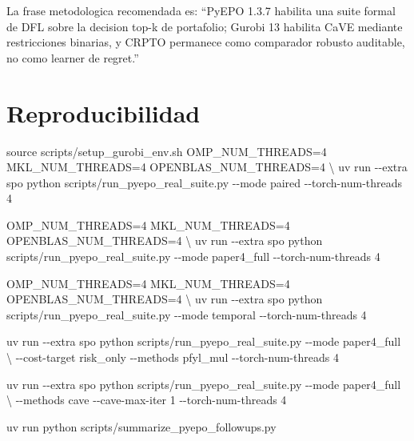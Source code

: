 \documentclass[
  spanish,
  11pt,
  letterpaper,
]{scrbook}
\newenvironment{Shaded}{\begin{snugshade}}{\end{snugshade}}
\newcommand{\AttributeTok}[1]{\textcolor[rgb]{0.40,0.45,0.13}{#1}}
\newcommand{\BuiltInTok}[1]{\textcolor[rgb]{0.00,0.23,0.31}{#1}}
\newcommand{\DataTypeTok}[1]{\textcolor[rgb]{0.68,0.00,0.00}{#1}}
\newcommand{\ExtensionTok}[1]{\textcolor[rgb]{0.00,0.23,0.31}{#1}}
\newcommand{\NormalTok}[1]{\textcolor[rgb]{0.00,0.23,0.31}{#1}}
\newcommand{\OperatorTok}[1]{\textcolor[rgb]{0.37,0.37,0.37}{#1}}
\newcommand{\VariableTok}[1]{\textcolor[rgb]{0.07,0.07,0.07}{#1}}
\theoremstyle{plain}
\theoremstyle{remark}
\begin{document}
La frase metodologica recomendada es: ``PyEPO 1.3.7 habilita una suite
formal de DFL sobre la decision top-k de portafolio; Gurobi 13 habilita
CaVE mediante restricciones binarias, y CRPTO permanece como comparador
robusto auditable, no como learner de regret.''

\section{Reproducibilidad}\label{reproducibilidad}

\begin{Shaded}
\begin{Highlighting}[]
\BuiltInTok{source}\NormalTok{ scripts/setup\_gurobi\_env.sh}
\VariableTok{OMP\_NUM\_THREADS}\OperatorTok{=}\NormalTok{4 }\VariableTok{MKL\_NUM\_THREADS}\OperatorTok{=}\NormalTok{4 }\VariableTok{OPENBLAS\_NUM\_THREADS}\OperatorTok{=}\NormalTok{4 }\DataTypeTok{\textbackslash{}}
\ExtensionTok{uv}\NormalTok{ run }\AttributeTok{{-}{-}extra}\NormalTok{ spo python scripts/run\_pyepo\_real\_suite.py }\AttributeTok{{-}{-}mode}\NormalTok{ paired }\AttributeTok{{-}{-}torch{-}num{-}threads}\NormalTok{ 4}

\VariableTok{OMP\_NUM\_THREADS}\OperatorTok{=}\NormalTok{4 }\VariableTok{MKL\_NUM\_THREADS}\OperatorTok{=}\NormalTok{4 }\VariableTok{OPENBLAS\_NUM\_THREADS}\OperatorTok{=}\NormalTok{4 }\DataTypeTok{\textbackslash{}}
\ExtensionTok{uv}\NormalTok{ run }\AttributeTok{{-}{-}extra}\NormalTok{ spo python scripts/run\_pyepo\_real\_suite.py }\AttributeTok{{-}{-}mode}\NormalTok{ paper4\_full }\AttributeTok{{-}{-}torch{-}num{-}threads}\NormalTok{ 4}

\VariableTok{OMP\_NUM\_THREADS}\OperatorTok{=}\NormalTok{4 }\VariableTok{MKL\_NUM\_THREADS}\OperatorTok{=}\NormalTok{4 }\VariableTok{OPENBLAS\_NUM\_THREADS}\OperatorTok{=}\NormalTok{4 }\DataTypeTok{\textbackslash{}}
\ExtensionTok{uv}\NormalTok{ run }\AttributeTok{{-}{-}extra}\NormalTok{ spo python scripts/run\_pyepo\_real\_suite.py }\AttributeTok{{-}{-}mode}\NormalTok{ temporal }\AttributeTok{{-}{-}torch{-}num{-}threads}\NormalTok{ 4}

\ExtensionTok{uv}\NormalTok{ run }\AttributeTok{{-}{-}extra}\NormalTok{ spo python scripts/run\_pyepo\_real\_suite.py }\AttributeTok{{-}{-}mode}\NormalTok{ paper4\_full }\DataTypeTok{\textbackslash{}}
  \AttributeTok{{-}{-}cost{-}target}\NormalTok{ risk\_only }\AttributeTok{{-}{-}methods}\NormalTok{ pfyl\_mul }\AttributeTok{{-}{-}torch{-}num{-}threads}\NormalTok{ 4}

\ExtensionTok{uv}\NormalTok{ run }\AttributeTok{{-}{-}extra}\NormalTok{ spo python scripts/run\_pyepo\_real\_suite.py }\AttributeTok{{-}{-}mode}\NormalTok{ paper4\_full }\DataTypeTok{\textbackslash{}}
  \AttributeTok{{-}{-}methods}\NormalTok{ cave }\AttributeTok{{-}{-}cave{-}max{-}iter}\NormalTok{ 1 }\AttributeTok{{-}{-}torch{-}num{-}threads}\NormalTok{ 4}

\ExtensionTok{uv}\NormalTok{ run python scripts/summarize\_pyepo\_followups.py}
\end{Highlighting}
\end{Shaded}
\end{document}
